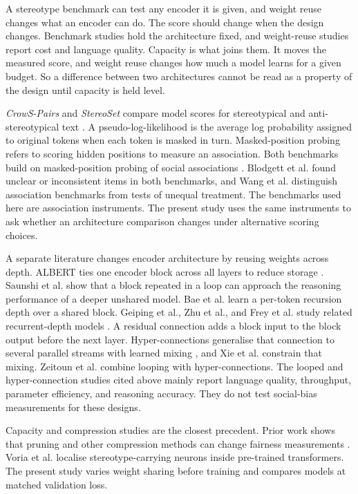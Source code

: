 \documentclass[sigconf,natbib=true,anonymous=true]{acmart}
\begin{document}
A stereotype benchmark can test any encoder it is given, and weight reuse changes what an encoder can do. The score should change when the design changes. Benchmark studies
hold the architecture fixed, and weight-reuse studies report cost and language
quality. Capacity is what joins them. It moves the measured
score, and weight reuse changes how much a model learns for a given budget. So
a difference between two architectures cannot be read as a property of the
design until capacity is held level.

\emph{CrowS-Pairs} and \emph{StereoSet} compare model scores for stereotypical
and anti-stereotypical text \citep{nangia2020crows,nadeem2021stereoset}. A
pseudo-log-likelihood is the average log probability assigned to original tokens
when each token is masked in turn. Masked-position probing refers to scoring hidden
positions to measure an association. Both benchmarks build on masked-position
probing of social associations \citep{kurita2019measuring}.
Blodgett et al. \citep{blodgett2021salmon} found unclear or inconsistent items in both
benchmarks, and Wang et al. \citep{wang2025difference} distinguish association benchmarks
from tests of unequal treatment. The benchmarks used here are association
instruments. The present study uses the same instruments to ask whether an
architecture comparison changes under alternative scoring choices.

A separate literature changes encoder architecture by reusing weights across
depth. ALBERT ties one encoder block across all layers to reduce storage
\citep{lan2020albert}. Saunshi et al. \citep{saunshi2025looped} show that a block repeated in a
loop can approach the reasoning performance of a deeper unshared model.
Bae et al. \citep{bae2025mor} learn a per-token recursion depth over a shared block.
Geiping et al., Zhu et al., and Frey et al. study related recurrent-depth
models \citep{geiping2025huginn,zhu2025ouro,frey2026adaptive}. A residual connection adds a block input
to the block output before the next layer. Hyper-connections generalise that
connection to several parallel streams with learned mixing
\citep{zhu2025hyperconnections}, and Xie et al. \citep{xie2025mhc} constrain that mixing.
Zeitoun et al. \citep{zeitoun2026hyperloop} combine looping with hyper-connections. The looped
and hyper-connection studies cited above mainly report language quality,
throughput, parameter efficiency, and reasoning accuracy. They do not test
social-bias measurements for these designs.

Capacity and compression studies are the closest precedent. Prior work shows
that pruning and other compression methods can change fairness measurements
\citep{hooker2020characterising,xu2022compression,ramesh2023comparative}.
Voria et al. \citep{voria2026tracing} localise stereotype-carrying neurons inside
pre-trained transformers. The present study varies weight sharing before
training and compares models at matched validation loss.
\end{document}
